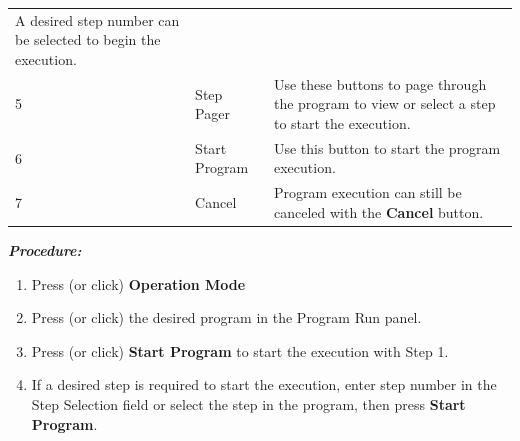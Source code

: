 \begin{longtable}[]{@{}lll@{}}
\begin{minipage}[t]{0.65\columnwidth}
A desired step number can be selected to begin the execution.\strut
\end{minipage}\tabularnewline
\begin{minipage}[t]{0.04\columnwidth}\raggedright
5\strut
\end{minipage} & \begin{minipage}[t]{0.23\columnwidth}\raggedright
Step Pager\strut
\end{minipage} & \begin{minipage}[t]{0.65\columnwidth}\raggedright
Use these buttons to page through the program to view or select a step
to start the execution.\strut
\end{minipage}\tabularnewline
\begin{minipage}[t]{0.04\columnwidth}\raggedright
6\strut
\end{minipage} & \begin{minipage}[t]{0.23\columnwidth}\raggedright
Start Program\strut
\end{minipage} & \begin{minipage}[t]{0.65\columnwidth}\raggedright
Use this button to start the program execution.\strut
\end{minipage}\tabularnewline
\begin{minipage}[t]{0.04\columnwidth}\raggedright
7\strut
\end{minipage} & \begin{minipage}[t]{0.23\columnwidth}\raggedright
Cancel\strut
\end{minipage} & \begin{minipage}[t]{0.65\columnwidth}\raggedright
Program execution can still be canceled with the \textbf{Cancel}
button.\strut
\end{minipage}\tabularnewline
\bottomrule
\end{longtable}

\textbf{\emph{Procedure:}}

\begin{enumerate}
\def\labelenumi{\arabic{enumi}.}
\tightlist
\item
  Press (or click) \textbf{Operation Mode}
\item
  Press (or click) the desired program in the Program Run panel.
\item
  Press (or click) \textbf{Start Program} to start the execution with
  Step 1.
\item
  If a desired step is required to start the execution, enter step
  number in the Step Selection field or select the step in the program,
  then press \textbf{Start Program}.
\end{enumerate}

